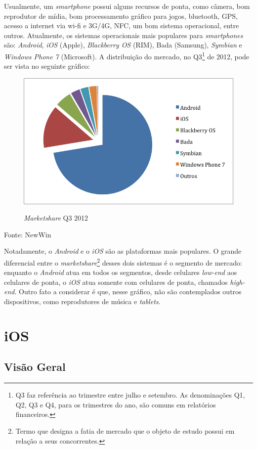	Usualmente, um \emph{smartphone} possui alguns recursos de ponta, como câmera, bom reprodutor de mídia, bom processamento gráfico para jogos, bluetooth, GPS, acesso a internet via wi-fi e 3G/4G, \ac{NFC}, um bom sistema operacional, entre outros. 
 Atualmente, os sistemas operacionais mais populares para \emph{smartphones} são: \emph{Android}, \emph{iOS} (Apple), \emph{Blackberry OS} (RIM), Bada (Samsung), \emph{Symbian} e \emph{Windows Phone 7} (Microsoft). A distribuição do mercado, no Q3\footnote{Q3 faz referência ao trimestre entre julho e setembro. As denominações Q1, Q2, Q3 e Q4, para os trimestres do ano, são comuns em relatórios financeiros.} de 2012, pode ser vista no seguinte gráfico:
 \begin{figure}[H]
   \centering
   \includegraphics[width=0.8\linewidth]{figs/smartpizza.png}\\
   \caption{ \emph{Marketshare} Q3 2012}
   \label{FIG:smartpizza}
 \end{figure}
 Fonte: NewWin \cite{neowin}
 
 Notadamente, o \emph{Android} e o \emph{iOS} são as plataformas mais populares. O grande diferencial entre o \emph{marketshare}\footnote{Termo que designa a fatia de mercado que o objeto de estudo possui em relação a seus concorrentes.} desses dois sistemas é o segmento de mercado: enquanto o \emph{Android} atua em todos os segmentos, desde celulares \emph{low-end} aos celulares de ponta, o \emph{iOS} atua somente com celulares de ponta, chamados \emph{high-end}. Outro fato a considerar é que, nesse gráfico, não são contemplados outros dispositivos, como reprodutores de música e \emph{tablets}.

 \section{iOS}
 \subsection{Visão Geral}

